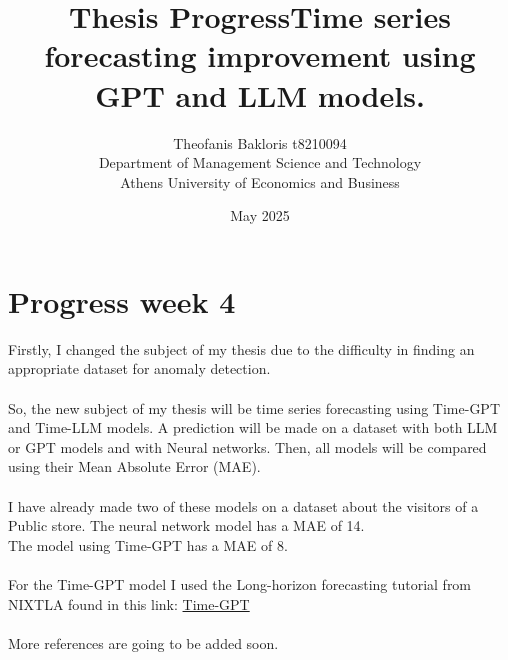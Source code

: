 \documentclass{article}
\title{\textbf{Thesis Progress}}
\author{Theofanis Bakloris t8210094\\
Department of Management Science and Technology\\
Athens University of Economics and Business}
\date{May 2025}
\begin{document}

\maketitle

\title{\textbf{Time series forecasting improvement using GPT and LLM models.\\
}}

\section{Progress week 4}

Firstly, I changed the subject of my thesis due to the difficulty in finding an appropriate dataset for anomaly detection.\\
\\
So, the new subject of my thesis will be time series forecasting using Time-GPT and Time-LLM models. A prediction will be made on a dataset with both LLM or GPT models and with Neural networks. Then, all models will be compared using their Mean Absolute Error (MAE).\\
\\
I have already made two of these models on a dataset about the visitors of a Public store.
The neural network model has a MAE of 14. \\
The model using Time-GPT has a MAE of 8. \\
\\
For the Time-GPT model I used the Long-horizon forecasting tutorial from NIXTLA found in this link: 
\href{https://www.nixtla.io/docs/tutorials-training-tutorials-long_horizon_forecasting#evaluation-results}{Time-GPT} \\
\\
More references are going to be added soon.



\nocite{*}
\end{document}
